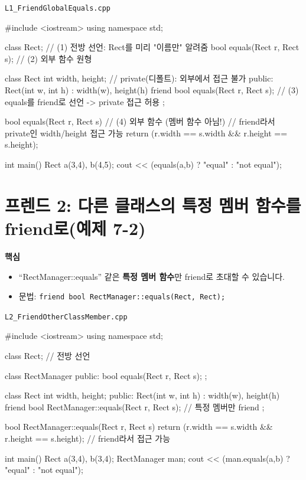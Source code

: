 \documentclass[11pt,a4paper]{article}
\newcommand{\filetag}[1]{\texttt{\color{Accent}#1}}
\begin{document}
\noindent\filetag{L1\_FriendGlobalEquals.cpp}
\begin{cppcode}
#include <iostream>
using namespace std;

class Rect;                       // (1) 전방 선언: Rect를 미리 "이름만" 알려줌
bool equals(Rect r, Rect s);      // (2) 외부 함수 원형

class Rect {
    int width, height;            // private(디폴트): 외부에서 접근 불가
public:
    Rect(int w, int h) : width(w), height(h) {}
    friend bool equals(Rect r, Rect s); // (3) equals를 friend로 선언 -> private 접근 허용
};

bool equals(Rect r, Rect s) {     // (4) 외부 함수 (멤버 함수 아님!)
    // friend라서 private인 width/height 접근 가능
    return (r.width == s.width && r.height == s.height);
}

int main() {
    Rect a(3,4), b(4,5);
    cout << (equals(a,b) ? "equal\n" : "not equal\n");
}
\end{cppcode}

\section{프렌드 2: 다른 클래스의 특정 멤버 함수를 friend로(예제 7-2)}
\begin{GoalBox}
\textbf{핵심}
\begin{itemize}[leftmargin=18pt]
  \item ``RectManager::equals'' 같은 \textbf{특정 멤버 함수}만 friend로 초대할 수 있습니다.
  \item 문법: \texttt{friend bool RectManager::equals(Rect, Rect);}
\end{itemize}
\end{GoalBox}

\noindent\filetag{L2\_FriendOtherClassMember.cpp}
\begin{cppcode}
#include <iostream>
using namespace std;

class Rect; // 전방 선언

class RectManager {
public:
    bool equals(Rect r, Rect s);
};

class Rect {
    int width, height;
public:
    Rect(int w, int h) : width(w), height(h) {}
    friend bool RectManager::equals(Rect r, Rect s); // 특정 멤버만 friend
};

bool RectManager::equals(Rect r, Rect s) {
    return (r.width == s.width && r.height == s.height); // friend라서 접근 가능
}

int main() {
    Rect a(3,4), b(3,4);
    RectManager man;
    cout << (man.equals(a,b) ? "equal\n" : "not equal\n");
}
\end{cppcode}
\end{document}
